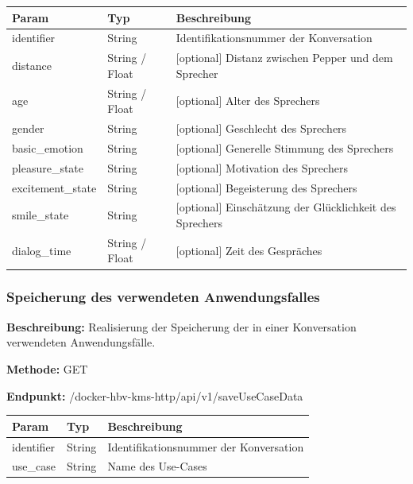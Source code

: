 \begin{table}[H]
    \label{table:/docker-hbv-kms-http/api/v1/saveEmotionData}
    \setlength{\tabcolsep}{3pt}
    \begin{tabular}{p{100pt}p{80pt}p{200pt}}
        \toprule
        Param             & Typ            & Beschreibung                                            \\
        \midrule
        identifier        & String         & Identifikationsnummer der Konversation                  \\
        distance          & String / Float & [optional] Distanz zwischen Pepper und dem Sprecher     \\
        age               & String / Float & [optional] Alter des Sprechers                          \\
        gender            & String         & [optional] Geschlecht des Sprechers                     \\
        basic\_emotion    & String         & [optional] Generelle Stimmung des Sprechers             \\
        pleasure\_state   & String         & [optional] Motivation des Sprechers                     \\
        excitement\_state & String         & [optional] Begeisterung des Sprechers                   \\
        smile\_state      & String         & [optional] Einschätzung der Glücklichkeit des Sprechers \\
        dialog\_time      & String / Float & [optional] Zeit des Gespräches                          \\
        \bottomrule
    \end{tabular}
\end{table}

\dotfill

\subsubsection{Speicherung des verwendeten Anwendungsfalles}
\label{sec:api-saveUseCaseData}
\textbf{Beschreibung:} Realisierung der Speicherung der in einer Konversation verwendeten Anwendungsfälle.

\textbf{Methode:} GET

\textbf{Endpunkt:} /docker-hbv-kms-http/api/v1/saveUseCaseData

\begin{table}[H]
    \label{table:/docker-hbv-kms-http/api/v1/saveUseCaseData}
    \setlength{\tabcolsep}{3pt}
    \begin{tabular}{p{100pt}p{80pt}p{200pt}}
        \toprule
        Param      & Typ    & Beschreibung                           \\
        \midrule
        identifier & String & Identifikationsnummer der Konversation \\
        use\_case  & String & Name des Use-Cases                     \\
        \bottomrule
    \end{tabular}
\end{table}

